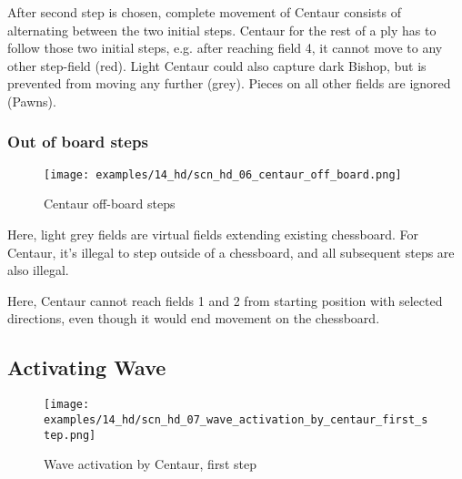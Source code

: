 After second step is chosen, complete movement of Centaur consists of alternating
between the two initial steps. Centaur for the rest of a ply has to follow those two
initial steps, e.g. after reaching field 4, it cannot move to any other step-field
(red). Light Centaur could also capture dark Bishop, but is prevented from moving
any further (grey). Pieces on all other fields are ignored (Pawns).

\clearpage %

\subsubsection*{Out of board steps}
\label{sec:Hemera's Dawn/Centaur/Movement/Out of board steps}

\vspace*{-1.3\baselineskip}
\noindent
\begin{figure}[!h]
\texttt{[image: examples/14\_hd/scn\_hd\_06\_centaur\_off\_board.png]}
\caption{Centaur off-board steps}
\label{fig:scn_hd_06_centaur_off_board}
\end{figure}

Here, light grey fields are virtual fields extending existing chessboard. For
Centaur, it's illegal to step outside of a chessboard, and all subsequent steps
are also illegal.

Here, Centaur cannot reach fields 1 and 2 from starting position with selected
directions, even though it would end movement on the chessboard.

\clearpage %

\subsection*{Activating Wave}
\label{sec:Hemera's Dawn/Centaur/Activating Wave}

\vspace*{-1.3\baselineskip}
\noindent
\begin{figure}[!h]
\texttt{[image: examples/14\_hd/scn\_hd\_07\_wave\_activation\_by\_centaur\_first\_step.png]}
\caption{Wave activation by Centaur, first step}
\label{fig:scn_hd_07_wave_activation_by_centaur_first_step}
\end{figure}


